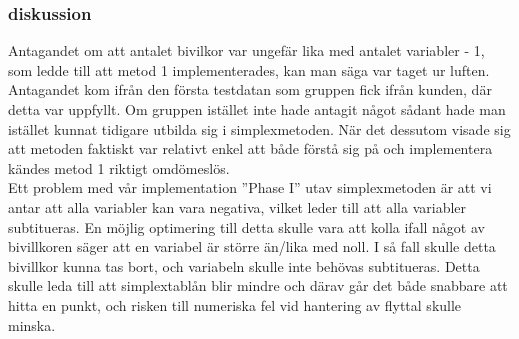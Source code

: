\subsubsection{diskussion}
Antagandet om att antalet bivilkor var ungefär lika med antalet variabler - 1, som ledde till att metod 1 implementerades, kan man säga var taget ur luften. Antagandet kom ifrån den första testdatan som gruppen fick ifrån kunden, där detta var uppfyllt. Om gruppen istället inte hade antagit något sådant hade man istället kunnat tidigare utbilda sig i simplexmetoden. När det dessutom visade sig att metoden faktiskt var relativt enkel att både förstå sig på och implementera kändes metod 1 riktigt omdömeslös. \\
Ett problem med vår implementation ''Phase I'' utav simplexmetoden är att vi antar att alla variabler kan vara negativa, vilket leder till att alla variabler subtitueras. En möjlig optimering till detta skulle vara att kolla ifall något av bivillkoren säger att en variabel är större än/lika med noll. I så fall skulle detta bivillkor kunna tas bort, och variabeln skulle inte behövas subtitueras. Detta skulle leda till att simplextablån blir mindre och därav går det både snabbare att hitta en punkt, och risken till numeriska fel vid hantering av flyttal skulle minska. 

